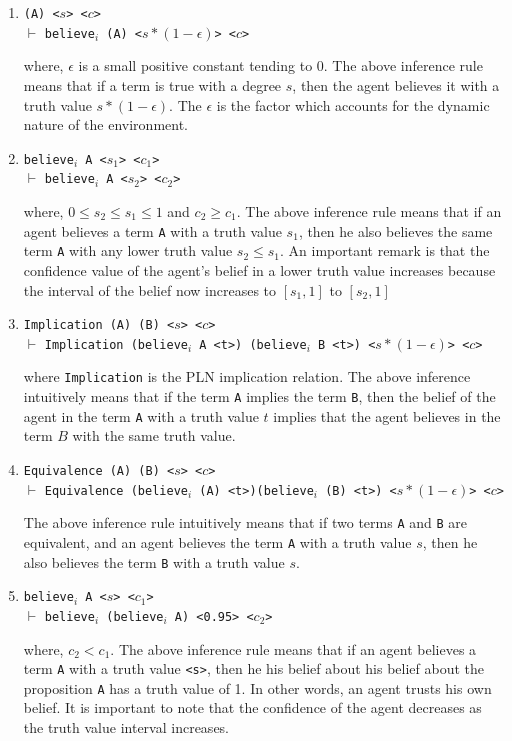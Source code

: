\documentclass[12pt]{article}
\begin{document}
\begin{enumerate}
\item
\texttt{(A) <$s$> <$c$>}\\
$\vdash$
\texttt{believe$_i$ (A) <$s*(1-\epsilon)$> <$c$>}

where, $\epsilon$ is a small positive constant tending to 0. The above inference rule means that if a term is true with a degree $s$, then the agent believes it with a truth value $s*(1-\epsilon)$. The $\epsilon$ is the factor which accounts for the dynamic nature of the environment.
\item
\texttt{believe$_i$ A <$s_1$> <$c_1$>}\\
$\vdash$
\texttt{believe$_i$ A <$s_2$> <$c_2$>}

where, $0\leq s_2\leq s_1\leq 1$ and $c_2\geq c_1$. The above inference rule means that if an agent believes a term \texttt{A} with a truth value $s_1$, then he also believes the same term \texttt{A} with any lower truth value $s_2\leq s_1$. An important remark is that the confidence value of the agent's belief in a lower truth value increases because the interval of the belief now increases to $[s_1,1]$ to $[s_2,1]$  
\item
\texttt{Implication (A) (B) <$s$> <$c$>}\\
$\vdash$
\texttt{Implication (believe$_i$ A <t>) (believe$_i$ B <t>) <$s*(1-\epsilon)$> <$c$>}

where \texttt{Implication} is the PLN implication relation. The above inference intuitively means that if the term \texttt{A} implies the term \texttt{B}, then the belief of the agent in the term \texttt{A} with a truth value $t$ implies that the agent believes in the term $B$ with the same truth value. 



\item
\texttt{Equivalence (A) (B) <$s$> <$c$>}\\
$\vdash$
\texttt{Equivalence (believe$_i$ (A) <t>)}\texttt{(believe$_i$ (B) <t>) <$s*(1-\epsilon)$> <$c$>}

The above inference rule intuitively means that if two terms \texttt{A} and \texttt{B} are equivalent, and an agent believes the term \texttt{A} with a truth value $s$, then he also believes the term \texttt{B} with a truth value $s$.

\item
\texttt{believe$_i$ A <$s$>  <$c_1$> }\\
$\vdash$
\texttt{believe$_i$  (believe$_i$ A) <0.95> <$c_2$>}

where, $c_2 < c_1$. The above inference rule means that if an agent believes a term \texttt{A} with a truth value \texttt{<s>}, then he his belief about his belief about the proposition \texttt{A} has a truth value of 1. In other words, an agent trusts his own belief. It is important to note that the confidence of the agent decreases as the truth value interval increases.

\end{enumerate}
\end{document}

